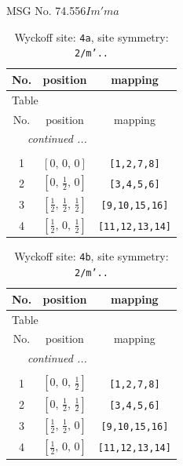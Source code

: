 \documentclass[fleqn,8pt]{jsarticle}
\begin{document}
\setcounter{MaxMatrixCols}{32}

\renewcommand{\tablename}{Table~}
\renewcommand{\figurename}{Figure~}
\begin{center}
\LARGE
MSG No. 74.556\quad$Im'ma$
\end{center}
\renewcommand{\arraystretch}{1.2}
\begin{longtable}{ccc}
\caption{Wyckoff site: {\tt 4a}, site symmetry: {\tt 2/m'..}}
 \\
 \hline \hline
No. & position & mapping \\ \hline \endfirsthead

\multicolumn{2}{l}{\tablename\ \thetable{}} \\
 \hline \hline
No. & position & mapping \\ \hline \endhead

 \hline \hline
\multicolumn{2}{r}{\footnotesize\it continued ...} \\ \endfoot

 \hline \hline
\multicolumn{2}{r}{} \\ \endlastfoot

1 & $\left[ 0,\, 0,\, 0 \right]$ & {\tt [1,2,7,8]} \\ \hline
2 & $\left[ 0,\, \frac{1}{2},\, 0 \right]$ & {\tt [3,4,5,6]} \\ \hline
3 & $\left[ \frac{1}{2},\, \frac{1}{2},\, \frac{1}{2} \right]$ & {\tt [9,10,15,16]} \\ \hline
4 & $\left[ \frac{1}{2},\, 0,\, \frac{1}{2} \right]$ & {\tt [11,12,13,14]} \\
\end{longtable}
\renewcommand{\arraystretch}{1.2}
\begin{longtable}{ccc}
\caption{Wyckoff site: {\tt 4b}, site symmetry: {\tt 2/m'..}}
 \\
 \hline \hline
No. & position & mapping \\ \hline \endfirsthead

\multicolumn{2}{l}{\tablename\ \thetable{}} \\
 \hline \hline
No. & position & mapping \\ \hline \endhead

 \hline \hline
\multicolumn{2}{r}{\footnotesize\it continued ...} \\ \endfoot

 \hline \hline
\multicolumn{2}{r}{} \\ \endlastfoot

1 & $\left[ 0,\, 0,\, \frac{1}{2} \right]$ & {\tt [1,2,7,8]} \\ \hline
2 & $\left[ 0,\, \frac{1}{2},\, \frac{1}{2} \right]$ & {\tt [3,4,5,6]} \\ \hline
3 & $\left[ \frac{1}{2},\, \frac{1}{2},\, 0 \right]$ & {\tt [9,10,15,16]} \\ \hline
4 & $\left[ \frac{1}{2},\, 0,\, 0 \right]$ & {\tt [11,12,13,14]} \\
\end{longtable}
\end{document}
